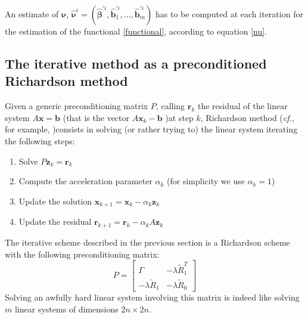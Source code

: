An estimate of $\bm{\nu}$, $\hat{\bm{\nu}}^i = (\hat{\bm{\beta}}^{\prime i},
	\hat{\bm{b}}_1^{\prime i}, \dots, \hat{\bm{b}}_m^{\prime i})$ has to be
computed at each iteration for the estimation of the functional
\ref{functional}, according to equation \ref{nu}.

\subsection{The iterative method as a preconditioned Richardson method}
Given a generic preconditioning matrix $P$, calling $\bm{r}_k$ the residual of
the linear system $A \bm{x} = \bm{b}$ (that is the vector $A \bm{x}_k - \bm{b}$
)at step $k$, Richardson method (\textit{cf.}, for example,
\cite{Quarteroni})consists in solving (or rather trying to) the linear system
iterating the following steps:
\begin{enumerate}
	\item Solve $P \bm{z}_k = \bm{r}_k$
	\item Compute the acceleration parameter $\alpha_k$ (for simplicity we use $\alpha_k = 1$)
	\item Update the solution $ \bm{x}_{k+1} = \bm{x}_{k} - \alpha_k \bm{z}_k $
	\item Update the residual $\bm{r}_{k+1} = \bm{r}_{k} - \alpha_k A \bm{z}_k$
\end{enumerate}

The iterative scheme described in the previous section is a Richardson scheme
with the following preconditioning matrix:
\begin{equation}
	\label{precond}
	P=
	\begin{bmatrix}
		\Gamma               & -\lambda \tilde{R}_1^T \\
		-\lambda \tilde{R}_1 & -\lambda \tilde{R}_0
	\end{bmatrix}
\end{equation}
Solving an awfully hard linear system involving this matrix is indeed
like solving $m$ linear systems of dimensions $2n\times 2n$.
